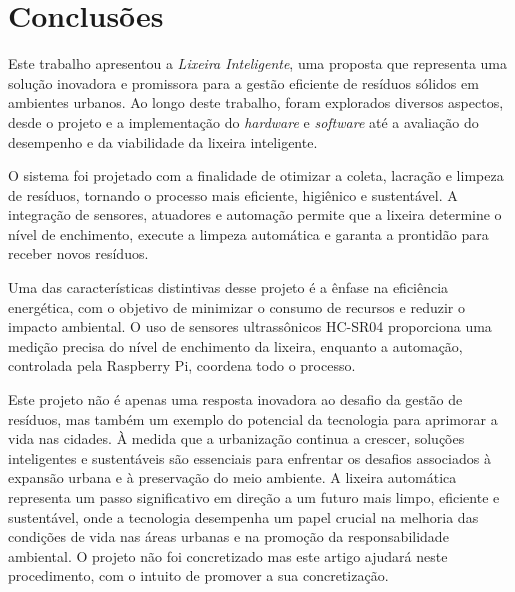 \section{Conclusões}

Este trabalho apresentou a \textit{Lixeira Inteligente}, uma proposta que representa uma solução inovadora e promissora para a gestão eficiente de resíduos sólidos em ambientes urbanos. Ao longo deste trabalho, foram explorados diversos aspectos, desde o projeto e a implementação do \textit{hardware} e \textit{software} até a avaliação do desempenho e da viabilidade da lixeira inteligente.

O sistema foi projetado com a finalidade de otimizar a coleta, lacração e limpeza de resíduos, tornando o processo mais eficiente, higiênico e sustentável. A integração de sensores, atuadores e automação permite que a lixeira determine o nível de enchimento, execute a limpeza automática e garanta a prontidão para receber novos resíduos.

Uma das características distintivas desse projeto é a ênfase na eficiência energética, com o objetivo de minimizar o consumo de recursos e reduzir o impacto ambiental. O uso de sensores ultrassônicos HC-SR04 proporciona uma medição precisa do nível de enchimento da lixeira, enquanto a automação, controlada pela Raspberry Pi, coordena todo o processo.

Este projeto não é apenas uma resposta inovadora ao desafio da gestão de resíduos, mas também um exemplo do potencial da tecnologia para aprimorar a vida nas cidades. À medida que a urbanização continua a crescer, soluções inteligentes e sustentáveis são essenciais para enfrentar os desafios associados à expansão urbana e à preservação do meio ambiente. A lixeira automática representa um passo significativo em direção a um futuro mais limpo, eficiente e sustentável, onde a tecnologia desempenha um papel crucial na melhoria das condições de vida nas áreas urbanas e na promoção da responsabilidade ambiental. O projeto não foi concretizado mas este artigo ajudará neste procedimento, com o intuito de promover a sua concretização.


